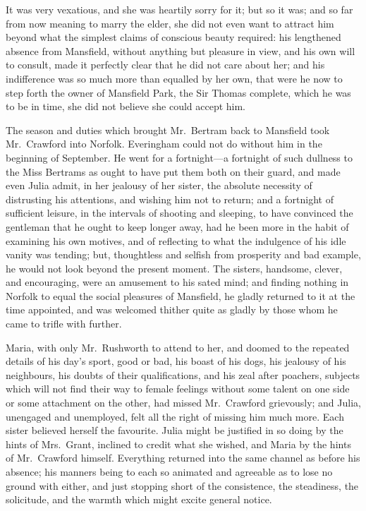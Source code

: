 \documentclass{article}
\begin{document}
It was very vexatious, and she was heartily sorry for it;
but so it was; and so far from now meaning to marry
the elder, she did not even want to attract him beyond
what the simplest claims of conscious beauty required:
his lengthened absence from Mansfield, without anything
but pleasure in view, and his own will to consult, made it
perfectly clear that he did not care about her; and his
indifference was so much more than equalled by her own,
that were he now to step forth the owner of Mansfield Park,
the Sir Thomas complete, which he was to be in time, she did
not believe she could accept him.

The season and duties which brought Mr.\ Bertram back to
Mansfield took Mr.\ Crawford into Norfolk.  Everingham could
not do without him in the beginning of September.  He went
for a fortnight---a fortnight of such dullness to the Miss
Bertrams as ought to have put them both on their guard,
and made even Julia admit, in her jealousy of her sister,
the absolute necessity of distrusting his attentions,
and wishing him not to return; and a fortnight of sufficient
leisure, in the intervals of shooting and sleeping, to have
convinced the gentleman that he ought to keep longer away,
had he been more in the habit of examining his own motives,
and of reflecting to what the indulgence of his idle vanity
was tending; but, thoughtless and selfish from prosperity
and bad example, he would not look beyond the present moment.
The sisters, handsome, clever, and encouraging, were an
amusement to his sated mind; and finding nothing in Norfolk
to equal the social pleasures of Mansfield, he gladly
returned to it at the time appointed, and was welcomed
thither quite as gladly by those whom he came to trifle with
further.

Maria, with only Mr.\ Rushworth to attend to her, and doomed
to the repeated details of his day's sport, good or bad,
his boast of his dogs, his jealousy of his neighbours,
his doubts of their qualifications, and his zeal after poachers,
subjects which will not find their way to female feelings
without some talent on one side or some attachment on
the other, had missed Mr.\ Crawford grievously; and Julia,
unengaged and unemployed, felt all the right of missing him
much more.  Each sister believed herself the favourite.
Julia might be justified in so doing by the hints
of Mrs.\ Grant, inclined to credit what she wished,
and Maria by the hints of Mr.\ Crawford himself.
Everything returned into the same channel as before his absence;
his manners being to each so animated and agreeable
as to lose no ground with either, and just stopping short
of the consistence, the steadiness, the solicitude,
and the warmth which might excite general notice.
\end{document}
